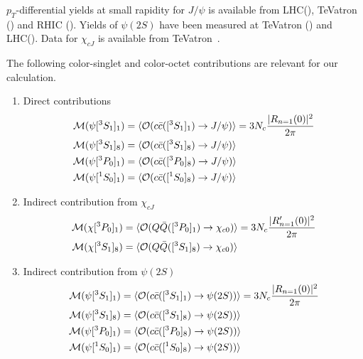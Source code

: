 \documentclass[article,showpacs,preprintnumbers,amsmath,amssymb]{revtex4}
\newcommand{\barQ}{{\bar{Q}}}
\newcommand{\barc}{{\bar{c}}}
\newcommand{\calO}{{\cal{O}}}
\begin{document}
\begin{appendix}
$p_T$-differential yields at small rapidity for $J/\psi$ is available from
LHC(\cite{Aad:2011sp,Chatrchyan:2012np}), TeVatron
(\cite{Abe:1997yz,Acosta:2004yw}) and RHIC
(\cite{Adare:2009js,Abelev:2009qaa}). Yields of $\psi(2S)$ have been measured
at TeVatron (\cite{Aaltonen:2009dm,Abe:1997yz,Abe:1997older}) and
LHC(\cite{Chatrchyan:2011kc}). Data for $\chi_{cJ}$ is available from
TeVatron~\cite{Abe:1997yz}.  

 The following color-singlet and color-octet contributions are relevant for our
calculation.
\begin{enumerate}
\item{Direct contributions
\begin{equation}
\begin{split}
{\cal{M}}(\psi[^3S_1]_{1})
 &=\langle \calO(c\barc([^3S_1]_{1})\rightarrow J/\psi)\rangle
 =3N_c\frac{|R_{n=1}(0)|^2}{2\pi}\\
{\cal{M}}(\psi[^3S_1]_{8})
 &=\langle \calO(c\barc([^3S_1]_{8})\rightarrow J/\psi)\rangle \\
{\cal{M}}(\psi[^3P_0]_{1})
 &= \langle \calO(c\barc([^3P_0]_{8})\rightarrow J/\psi)\rangle \\
{\cal{M}}(\psi[^1S_0]_{1})
 &=\langle \calO(c\barc([^1S_0]_{8})\rightarrow J/\psi)\rangle 
~\label{eq:Mpsi1}
\end{split}
\end{equation}
    }
\item{Indirect contribution from $\chi_{cJ}$
\begin{equation}
\begin{split}
{\cal{M}}(\chi[^3P_0]_{1}) 
 &= \langle \calO(Q\barQ([^3P_0]_{1})\rightarrow \chi_{c0})\rangle  = 
3N_c\frac{|R^\prime_{n=1}(0)|^2}{2\pi}\\
{\cal{M}}(\chi[^3S_1]_{8})
 &=\langle \calO(Q\barQ([^3S_1]_{8})\rightarrow \chi_{c0})\rangle
~\label{eq:Mchi}
\end{split}
\end{equation}
    }
\item{Indirect contribution from $\psi(2S)$
\begin{equation}
\begin{split}
{\cal{M}}(\psi[^3S_1]_{1})
 &=\langle \calO(c\barc([^3S_1]_{1})\rightarrow \psi(2S))\rangle
 =3N_c\frac{|R_{n=1}(0)|^2}{2\pi}\\
{\cal{M}}(\psi[^3S_1]_{8})
 &=\langle \calO(c\barc([^3S_1]_{8})\rightarrow \psi(2S))\rangle \\
{\cal{M}}(\psi[^3P_0]_{1})
 &= \langle \calO(c\barc([^3P_0]_{8})\rightarrow \psi(2S))\rangle \\
{\cal{M}}(\psi[^1S_0]_{1})
 &=\langle \calO(c\barc([^1S_0]_{8})\rightarrow \psi(2S))\rangle 
~\label{eq:Mpsi2}
\end{split}
\end{equation}
    }
\end{enumerate}


\end{appendix}
\end{document}
